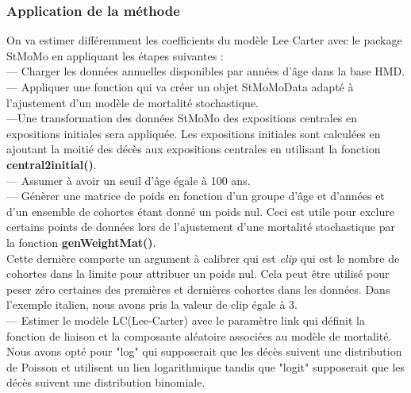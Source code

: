\documentclass[french]{report}
\begin{document}
\subsubsection{Application de la méthode}
On va estimer différemment les coefficients du modèle Lee Carter avec le package StMoMo en appliquant les étapes suivantes :\\
\newline
\newline
--- Charger les données annuelles disponibles par années d'âge dans la base HMD. \\
\newline
---  Appliquer une fonction qui va créer un objet StMoMoData adapté à l'ajustement d'un modèle de mortalité stochastique.\\
\newline
---Une transformation des données StMoMo des expositions centrales en expositions initiales sera appliquée. Les expositions initiales sont calculées en ajoutant la moitié des décès aux expositions centrales en utilisant la fonction \textbf{central2initial()}. \\
\newline
--- Assumer à avoir un seuil d'âge égale à 100 ans.\\
\newline
--- Génèrer une matrice de poids en fonction d'un groupe d'âge et d'années et d'un ensemble de cohortes étant donné un poids nul. Ceci est utile pour exclure certains points de données lors de l'ajustement d'une mortalité stochastique par la fonction \textbf{genWeightMat()}.\\
Cette dernière comporte un argument à calibrer qui est \textit{clip} qui est le nombre de cohortes dans la limite pour attribuer un poids nul. Cela peut être utilisé pour peser zéro certaines des premières et dernières cohortes dans les données.
Dans l'exemple italien, nous avons pris la valeur de clip égale à 3.\\
\newline
--- Estimer le modèle LC(Lee-Carter)
avec le paramètre link qui  définit la fonction de liaison et la composante aléatoire associées au modèle de mortalité. Nous avons opté pour "log" qui supposerait que les décès suivent une distribution de Poisson et utilisent un lien logarithmique tandis que "logit" supposerait que les décès suivent une distribution binomiale.
\end{document}
